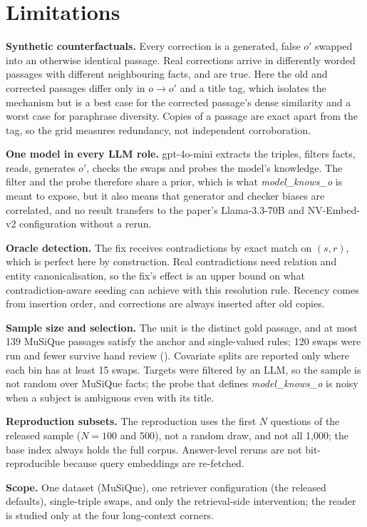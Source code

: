 \section{Limitations}\label{sec:limitations}

\textbf{Synthetic counterfactuals.} Every correction is a generated, false $o'$ swapped into an otherwise identical
passage. Real corrections arrive in differently worded passages with different neighbouring facts, and are true. Here
the old and corrected passages differ only in $o \to o'$ and a title tag, which isolates the mechanism but is a best
case for the corrected passage's dense similarity and a worst case for paraphrase diversity. Copies of a passage are
exact apart from the tag, so the grid measures redundancy, not independent corroboration.

\textbf{One model in every LLM role.} gpt-4o-mini extracts the triples, filters facts, reads, generates $o'$, checks
the swaps and probes the model's knowledge. The filter and the probe therefore share a prior, which is what
\emph{model\_knows\_o} is meant to expose, but it also means that generator and checker biases are correlated, and no
result transfers to the paper's Llama-3.3-70B and NV-Embed-v2 configuration without a rerun.

\textbf{Oracle detection.} The fix receives contradictions by exact match on $(s, r)$, which is perfect here by
construction. Real contradictions need relation and entity canonicalisation, so the fix's effect is an upper bound on
what contradiction-aware seeding can achieve with this resolution rule. Recency comes from insertion order, and
corrections are always inserted after old copies.

\textbf{Sample size and selection.} The unit is the distinct gold passage, and at most 139 MuSiQue passages satisfy the
anchor and single-valued rules; 120 swaps were run and fewer survive hand review (). Covariate splits
are reported only where each bin has at least 15 swaps. Targets were filtered by an LLM, so the sample is not random over
MuSiQue facts; the probe that defines \emph{model\_knows\_o} is noisy when a subject is ambiguous even with its title.

\textbf{Reproduction subsets.} The reproduction uses the first $N$ questions of the released sample ($N = 100$ and
$500$), not a random draw, and not all 1,000; the base index always holds the full corpus. Answer-level reruns are not
bit-reproducible because query embeddings are re-fetched.

\textbf{Scope.} One dataset (MuSiQue), one retriever configuration (the released defaults), single-triple swaps, and
only the retrieval-side intervention; the reader is studied only at the four long-context corners.
